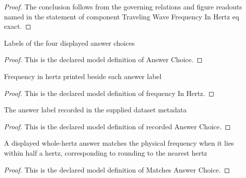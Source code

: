 \begin{proof}
  The conclusion follows from the governing relations and figure readouts named in the statement of component Traveling Wave Frequency In Hertz eq exact.
\end{proof}
\begin{definition}
  \label{def:physics:phyx-mini-0295:phyxminiproblems-problemphyxmini0295-answerchoice}
  Labels of the four displayed answer choices
\end{definition}
\begin{proof}
  This is the declared model definition of Answer Choice.
\end{proof}
\begin{definition}
  \label{def:physics:phyx-mini-0295:phyxminiproblems-problemphyxmini0295-answerchoice-frequencyinhertz}
  Frequency in hertz printed beside each answer label
\end{definition}
\begin{proof}
  This is the declared model definition of frequency In Hertz.
\end{proof}
\begin{definition}
  \label{def:physics:phyx-mini-0295:phyxminiproblems-problemphyxmini0295-recordedanswerchoice}
  The answer label recorded in the supplied dataset metadata
\end{definition}
\begin{proof}
  This is the declared model definition of recorded Answer Choice.
\end{proof}
\begin{definition}
  \label{def:physics:phyx-mini-0295:phyxminiproblems-problemphyxmini0295-matchesanswerchoice}
  A displayed whole-hertz answer matches the physical frequency when it lies within half a hertz, corresponding to rounding to the nearest hertz
\end{definition}
\begin{proof}
  This is the declared model definition of Matches Answer Choice.
\end{proof}
